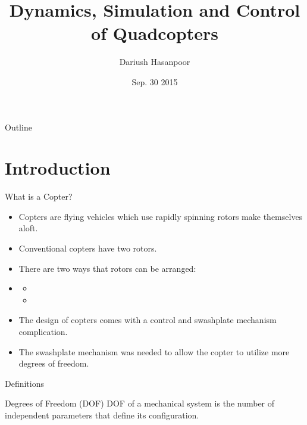 \documentclass[8pt]{beamer}
\title[\scalebox{.8}{Dynamics, Simulation and Control of Quadcopters}]{Dynamics, Simulation and Control of Quadcopters}
\author[\scalebox{.8}{Dariush Hasanpoor}]{Dariush Hasanpoor}
\institute[]{Isfahan University Of Technology}
\date[\scalebox{.8}{Isfahan University Of Technology}]{Sep. 30 2015}
\newcommand{\Ytri}{$\triangleright$ }
\renewcommand{\|}[1][.3em]{\hspace{#1}|\hspace{#1}}
\renewcommand{\,}[1][.3em]{,\hspace{#1}}
\newcommand{\subitem}{\item[\Ytri]}
\begin{document}
\begin{frame}
  \titlepage
\end{frame}

\begin{frame}{Outline}
  \tableofcontents[hideallsubsections]
\end{frame}

\section{Introduction}
\frame{\tableofcontents[currentsection]}

\begin{frame}{What is a Copter?}
    \begin{itemize}[<+->]
    \item Copters are flying vehicles which use rapidly spinning rotors make themselves aloft.
    \item Conventional copters have two rotors.
    \item There are two ways that rotors can be arranged:
    \item[] \begin{itemize}
        \subitem {}
        \subitem {}
    \end{itemize}
    \item The design of copters comes with a control and swashplate mechanism complication.
    \item The swashplate mechanism was needed to allow the copter to utilize more degrees of freedom.
    \end{itemize}
\end{frame}

\begin{frame}{Definitions}
    \begin{block}{Degrees of Freedom (DOF)}
	DOF of a mechanical system is the number of independent parameters that define its configuration.
    \end{block}
\end{frame}
\end{document}
